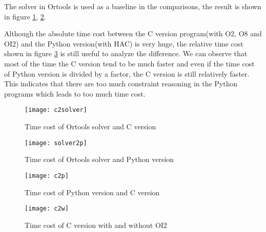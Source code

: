 \documentclass[a4paper, 12pt]{report}
\begin{document}
        The solver in Ortools is used as a baseline in the comparisons, the result is shown in figure \ref{c2solver}, \ref{solver2p}.

        Although the absolute time cost between the C version program(with O2, O8 and OI2) and the Python version(with HAC) is very huge, the relative time cost shown in figure \ref{c2p} is still useful to analyze the difference. We can observe that most of the time the C version tend to be much faster and even if the time cost of Python version is divided by a factor, the C version is still relatively faster. This indicates that there are too much constraint reasoning in the
        Python programs which leads to too much time cost.
        \begin{figure}[H]
            \centering
            \texttt{[image: c2solver]}
            \caption{Time cost of Ortools solver and C version}
            \label{c2solver}
        \end{figure}

        \begin{figure}[H]
            \centering
            \texttt{[image: solver2p]}
            \caption{Time cost of Ortools solver and Python version}
            \label{solver2p}
        \end{figure}

        \begin{figure}[H]
            \centering
            \texttt{[image: c2p]}
            \caption{Time cost of Python version and C version}
            \label{c2p}
        \end{figure}

        \begin{figure}[H]
            \centering
            \texttt{[image: c2w]}
            \caption{Time cost of C version with and without OI2}
            \label{c2w}
        \end{figure}
\end{document}
